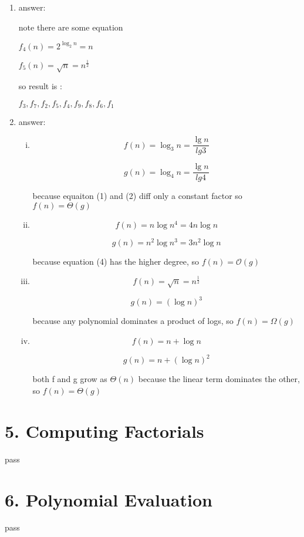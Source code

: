 \documentclass[11pt]{article}
\newenvironment{qparts}{\begin{enumerate}[{(}a{)}]}{\end{enumerate}}
\begin{document}
\begin{qparts}
\item answer:

note there are some equation

$ f_4(n) =2^{\log_{2}{n}} = n $

$ f_5(n) = \sqrt{n} =  n^{\frac{1}{2}} $

so result is :

$ f_3,f_7,f_2,f_5,f_4,f_9,f_8,f_6,f_1 $

\item answer:

\begin{enumerate}[i.]
    \item
    \begin{equation}
        f(n) = \log_3{n} = \frac{\lg{n}}{lg{3}}  \label{1}
    \end{equation}

    \begin{equation}
        g(n) = \log_4{n} = \frac{\lg{n}}{lg{4}}  \label{2}
    \end{equation}
    
    because equaiton (1) and (2) diff only a constant factor so  $ f(n) = \Theta(g) $
    
    \item
    \begin{equation}
        f(n) = n\log{n^4} = 4n\log{n}  \label{3}
    \end{equation}
    
    \begin{equation}
        g(n) = n^2\log{n^3} = 3n^2\log{n}  \label{4}
    \end{equation}
    
    because equation (4) has the higher degree, so $ f(n) = \mathcal{O}(g) $
    
    \item
    \begin{equation}
        f(n) = \sqrt{n} = n^{\frac{1}{2}} \label{5}
    \end{equation}
    
    \begin{equation}
        g(n) = (\log{n})^3  \label{6}
    \end{equation}
    
    because any polynomial dominates a product of logs, so $ f(n) = \Omega{(g)} $
    
    \item
    \begin{equation}
        f(n) = n + \log{n} \label{5}
    \end{equation}
    
    \begin{equation}
        g(n) = n + (\log{n})^2  \label{6}
    \end{equation}
    
    both f and g grow as $ \Theta(n) $ because the linear term dominates the other, so  $ f(n) = \Theta(g) $

\end{enumerate}
\end{qparts}

\section*{5. Computing Factorials}
pass

\section*{6. Polynomial Evaluation}
pass
\end{document}
